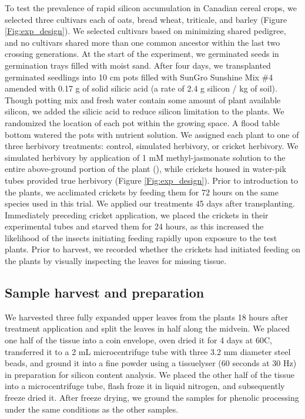 \documentclass[12pt, letterpaper]{report}
\begin{document}
To test the prevalence of rapid silicon accumulation in Canadian cereal crops, we selected three cultivars each of oats, bread wheat, triticale, and barley (Figure \ref{Fig:exp_design}). We selected cultivars based on minimizing shared pedigree, and no cultivars shared more than one common ancestor within the last two crossing generations. At the start of the experiment, we germinated seeds in germination trays filled with moist sand. After four days, we transplanted germinated seedlings into 10 cm pots filled with SunGro Sunshine Mix \#4 amended with 0.17 g of solid silicic acid (a rate of 2.4 g silicon / kg of soil). Though potting mix and fresh water contain some amount of plant available silicon, we added the silicic acid to reduce silicon limitation to the plants. We randomized the location of each pot within the growing space. A flood table bottom watered the pots with nutrient solution. We assigned each plant to one of three herbivory treatments: control, simulated herbivory, or cricket herbivory. We simulated herbivory by application of 1 mM methyl-jasmonate solution to the entire above-ground portion of the plant (\cite{waterman_short-term_2021}), while crickets housed in water-pik tubes provided true herbivory (Figure \ref{Fig:exp_design}). Prior to introduction to the plants, we acclimated crickets by feeding them for 72 hours on the same species used in this trial. We applied our treatments 45 days after transplanting. Immediately preceding cricket application, we placed the crickets in their experimental tubes and starved them for 24 hours, as this increased the likelihood of the insects initiating feeding rapidly upon exposure to the test plants. Prior to harvest, we recorded whether the crickets had initiated feeding on the plants by visually inspecting the leaves for missing tissue. 

\subsection{Sample harvest and preparation}

We harvested three fully expanded upper leaves from the plants 18 hours after treatment application and split the leaves in half along the midvein. We placed one half of the tissue into a coin envelope, oven dried it for 4 days at 60\degree C, transferred it to a 2 mL microcentrifuge tube with three 3.2 mm diameter steel beads, and ground it into a fine powder using a tissuelyser (60 seconds at 30 Hz) in preparation for silicon content analysis. We placed the other half of the tissue into a microcentrifuge tube, flash froze it in liquid nitrogen, and subsequently freeze dried it. After freeze drying, we ground the samples for phenolic processing under the same conditions as the other samples.
\end{document}

